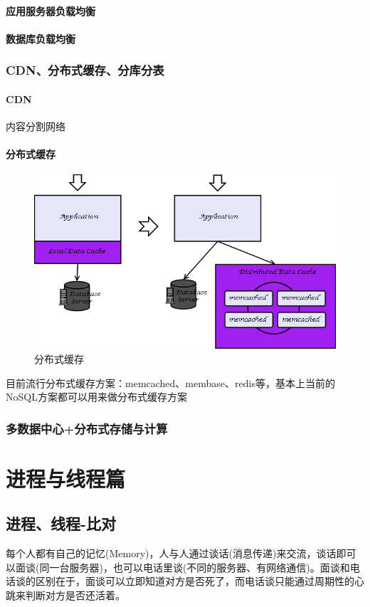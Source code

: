 \documentclass[UTF8,a4paper,12pt]{ctexbook}
\begin{document}
			\subsubsection{应用服务器负载均衡}
			
			\subsubsection{数据库负载均衡}
			
		\subsection{CDN、分布式缓存、分库分表}
			\subsubsection{CDN}内容分割网络
			
			\subsubsection{分布式缓存}		
				\begin{figure}[ht]
					\centering
					\includegraphics[width=0.7\linewidth]{figures/server-distributedCache}
					\caption{分布式缓存}
					\label{fig:server-distributedcache}
				\end{figure}
				
			 目前流行分布式缓存方案：memcached、membase、redis等，基本上当前的NoSQL方案都可以用来做分布式缓存方案
			 
		\subsection{多数据中心+分布式存储与计算}
		
		
\chapter{进程与线程篇}
	\section{进程、线程-比对}
 	 每个人都有自己的记忆(Memory)，人与人通过谈话(消息传递)来交流，谈话即可以面谈(同一台服务器)，也可以电话里谈(不同的服务器、有网络通信)。面谈和电话谈的区别在于，面谈可以立即知道对方是否死了，而电话谈只能通过周期性的心跳来判断对方是否还活着。
 	 
\end{document}
